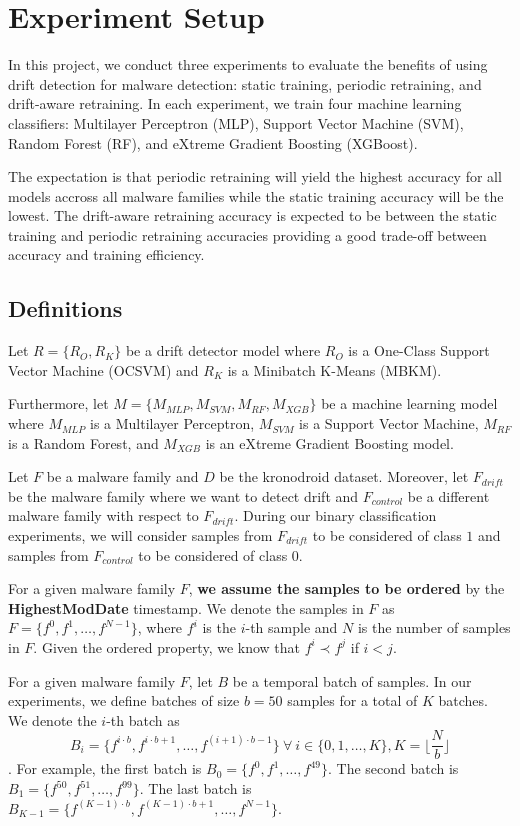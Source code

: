 \section{Experiment Setup\label{sec:setup}}
In this project, we conduct three experiments to evaluate the benefits of using
drift detection for malware detection: static training, periodic retraining,
and drift-aware retraining. In each experiment, we train four machine learning classifiers:
Multilayer Perceptron (MLP), Support Vector Machine (SVM), Random Forest (RF),
and eXtreme Gradient Boosting (XGBoost).

The expectation is that periodic retraining will yield the highest accuracy
for all models accross all malware families while the static training accuracy
will be the lowest. The drift-aware retraining accuracy is expected to be
between the static training and periodic retraining accuracies providing
a good trade-off between accuracy and training efficiency.

\subsection{Definitions}

Let $R = \{R_{O}, R_{K}\}$ be a drift detector model where $R_{O}$ is a
One-Class Support Vector Machine (OCSVM) and $R_{K}$ is a Minibatch K-Means (MBKM).

Furthermore, let $M = \{M_{MLP}, M_{SVM}, M_{RF}, M_{XGB}\}$ be
a machine learning model where $M_{MLP}$ is a Multilayer Perceptron,
$M_{SVM}$ is a Support Vector Machine, $M_{RF}$ is a Random Forest,
and $M_{XGB}$ is an eXtreme Gradient Boosting model.

Let $F$ be a malware family and $D$ be the kronodroid dataset. Moreover,
let $F_{drift}$ be the malware family where we want to detect drift and
$F_{control}$ be a different malware family with respect to $F_{drift}$.
During our binary classification experiments, we will consider samples from $F_{drift}$
to be considered of class $1$ and samples from $F_{control}$ to be considered
of class $0$.

For a given malware family $F$, \textbf{we assume the samples to be ordered}
by the \textbf{HighestModDate} timestamp.
We denote the samples in $F$ as
$F = \{f^{0}, f^{1}, \ldots, f^{N-1}\}$, where $f^{i}$ is the $i$-th sample
and $N$ is the number of samples in $F$. Given the ordered property,
we know that $f^{i} \prec f^{j}$ if $i < j$.

For a given malware family $F$,
let $B$ be a temporal batch of samples. In our experiments, we define batches
of size $b = 50$ samples for a total of $K$ batches. We denote the $i$-th batch as
$$B_{i} = \{f^{i \cdot b}, f^{i \cdot b + 1}, \ldots, f^{(i+1) \cdot b - 1}\}
    ~\forall~ i \in \{0, 1, \ldots,  K\}, K = \lfloor \frac{N}{b} \rfloor$$.
For example, the first batch is $B_{0} = \{f^{0}, f^{1}, \ldots, f^{49}\}$.
The second batch is $B_{1} = \{f^{50}, f^{51}, \ldots, f^{99}\}$.
The last batch is $B_{K-1} = \{f^{(K-1) \cdot b}, f^{(K-1) \cdot b + 1}, \ldots, f^{N-1}\}$.

